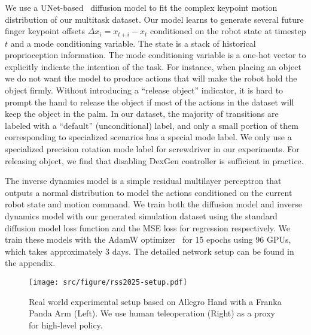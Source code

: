 We use a UNet-based~\cite{ronneberger2015u} diffusion model to fit the complex keypoint motion distribution of our multitask dataset. Our model learns to generate several future finger keypoint offsets $\Delta{x}_{i} = x_{t+i} - x_{t}$ conditioned on the robot state at timestep $t$ and a mode conditioning variable. The state is a stack of historical proprioception information. The mode conditioning variable is a one-hot vector to explicitly indicate the intention of the task. For instance, when placing an object we do not want the model to produce actions that will make the robot hold the object firmly. Without introducing a ``release object'' indicator, it is hard to prompt the hand to release the object if most of the actions in the dataset will keep the object in the palm. In our dataset, the majority of transitions are labeled with a ``default'' (unconditional) label, and only a small portion of them corresponding to specialized scenarios has a special mode label. We only use a specialized precision rotation mode label for screwdriver in our experiments. For releasing object, we find that disabling DexGen controller is sufficient in practice.

The inverse dynamics model is a simple residual multilayer perceptron that outputs a normal distribution to model the actions conditioned on the current robot state and motion command. We train both the diffusion model and inverse dynamics model with our generated simulation dataset using the standard diffusion model loss function and the MSE loss for regression respectively. We train these models with the AdamW optimizer~\cite{loshchilov2017decoupled, kingma2014adam} for 15 epochs using 96 GPUs, which takes approximately 3 days. The detailed network setup can be found in the appendix. 

\begin{figure}[t]
    \centering
    \texttt{[image: src/figure/rss2025-setup.pdf]}
    \caption{Real world experimental setup based on Allegro Hand with a Franka Panda Arm (Left). We use human teleoperation (Right) as a proxy for high-level policy.}
    \label{fig:enter-label}
\end{figure}

